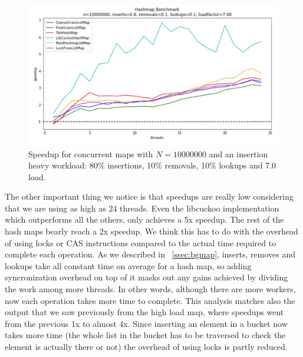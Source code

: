 \documentclass[11pt]{article}
\begin{document}
\begin{figure}[!htb]
\centering
\includegraphics[width=1.0\linewidth]{figs/patricio/latedays/inserts_heavy_highload.jpg}
\caption{
Speedup for concurrent maps with $N=10000000$ and an insertion heavy workload:
80\% insertions, 10\% removals, 10\% lookups and 7.0 load.}
\label{fig:mapInsertHeavyBigLoad}
\end{figure}

The other important thing we notice is that speedups are really low considering
that we are using as high as 24 threads. Even the libcuckoo implementation which
outperforms all the others, only achieves a 5x speedup. The rest of the hash
maps bearly reach a 2x speedup. We think this has to do with the overhead of
using locks or CAS instructions compared to the actual time required to complete
each operation. As we described in ~\ref{ssec:bgmap}, inserts, removes and
lookups take all constant time on average for a hash map, so adding
syncronization overhead on top of it masks out any gains achieved by dividing
the work among more threads. In other words, although there are more workers,
now each operation takes more time to complete. This analysis matches also the
output that we saw previously from the high load map, where speedups went from
the previous 1x to almost 4x. Since inserting an element in a bucket now takes more
time (the whole list in the bucket has to be traversed to check the element is
actually there or not) the overhead of using locks is partly reduced.
\end{document}
